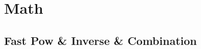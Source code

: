 \documentclass[a4paper,10pt,twocolumn,oneside]{article}
\begin{document}
% 

% 

% 

%

% 

% 

% 

% 

\section{Math}

\subsection{Fast Pow \& Inverse \& Combination}

\end{document}
